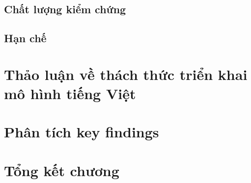 \subsection{Chất lượng kiểm chứng}

\subsection{Hạn chế}

\section{Thảo luận về thách thức triển khai mô hình tiếng Việt}


\section{Phân tích key findings}


\section{Tổng kết chương}

